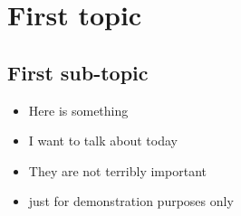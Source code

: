 \section{First topic}

\sectioncover

\subsection{First sub-topic}

\subsectioncover

\begin{frame}
  \begin{itemize}
    \item Here is something
    \item I want to talk about today
    \item They are not terribly important
          \pause
    \item just for demonstration purposes only
  \end{itemize}
\end{frame}
